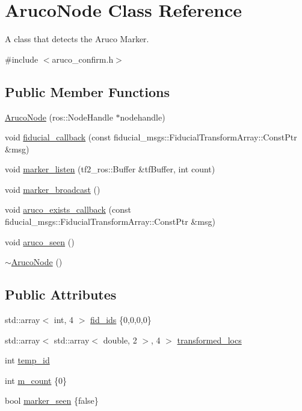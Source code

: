 \hypertarget{class_aruco_node}{}\section{Aruco\+Node Class Reference}
\label{class_aruco_node}


A class that detects the Aruco Marker.  




{\ttfamily \#include $<$aruco\+\_\+confirm.\+h$>$}

\subsection*{Public Member Functions}
\begin{DoxyCompactItemize}
\item 
\hyperlink{class_aruco_node_ad539e5027a1d41e9e62f354db9ec40aa}{Aruco\+Node} (ros\+::\+Node\+Handle $\ast$nodehandle)
\item 
void \hyperlink{class_aruco_node_af68c583d73a36c483d28b96a6fd22713}{fiducial\+\_\+callback} (const fiducial\+\_\+msgs\+::\+Fiducial\+Transform\+Array\+::\+Const\+Ptr \&msg)
\item 
void \hyperlink{class_aruco_node_ad79fd951057c9a40f34fc159363fbd94}{marker\+\_\+listen} (tf2\+\_\+ros\+::\+Buffer \&tf\+Buffer, int count)
\item 
void \hyperlink{class_aruco_node_adb4d7fb3af40cb83ae69be077c589558}{marker\+\_\+broadcast} ()
\item 
void \hyperlink{class_aruco_node_a38f5977cae0f0cc0d30449db22b2e9d6}{aruco\+\_\+exists\+\_\+callback} (const fiducial\+\_\+msgs\+::\+Fiducial\+Transform\+Array\+::\+Const\+Ptr \&msg)
\item 
void \hyperlink{class_aruco_node_a21fe5af1a16e884424a4065ca6dd608f}{aruco\+\_\+seen} ()
\item 
\hyperlink{class_aruco_node_a134694163a28530a800198e2c039eb25}{$\sim$\+Aruco\+Node} ()
\end{DoxyCompactItemize}
\subsection*{Public Attributes}
\begin{DoxyCompactItemize}
\item 
std\+::array$<$ int, 4 $>$ \hyperlink{class_aruco_node_aa64bc8aad47d7569e315f5045ecaa7ac}{fid\+\_\+ids} \{0,0,0,0\}
\item 
std\+::array$<$ std\+::array$<$ double, 2 $>$, 4 $>$ \hyperlink{class_aruco_node_ab410bc0b655071ee67e7ba63b4edf256}{transformed\+\_\+locs}
\item 
int \hyperlink{class_aruco_node_ac9561321e855855ccc8f643cc139a638}{temp\+\_\+id}
\item 
int \hyperlink{class_aruco_node_a454cdb8d15fa07e7913887a1b2029600}{m\+\_\+count} \{0\}
\item 
bool \hyperlink{class_aruco_node_a21fe489a4ab6a73e807e74a5c1de466d}{marker\+\_\+seen} \{false\}
\end{DoxyCompactItemize}


